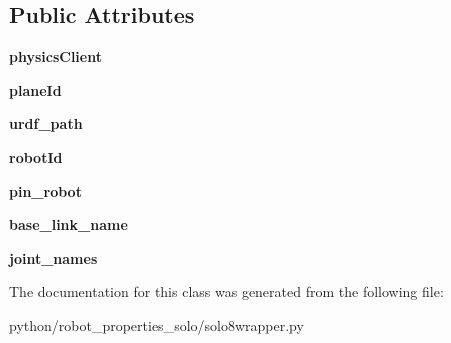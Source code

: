 \subsection*{Public Attributes}
\begin{DoxyCompactItemize}
\item 
\mbox{\label{classrobot__properties__solo_1_1solo8wrapper_1_1Solo8Robot_af82fb3fc2b4f8a60353bb8ff96713fd7}} 
{\bfseries physics\+Client}
\item 
\mbox{\label{classrobot__properties__solo_1_1solo8wrapper_1_1Solo8Robot_aae39d72dbc2fb10f4809cf1f55edb993}} 
{\bfseries plane\+Id}
\item 
\mbox{\label{classrobot__properties__solo_1_1solo8wrapper_1_1Solo8Robot_a43aff6849cbb3535a0cece77ef41b383}} 
{\bfseries urdf\+\_\+path}
\item 
\mbox{\label{classrobot__properties__solo_1_1solo8wrapper_1_1Solo8Robot_a38b69aeb9598f0261afdb96b531a26bc}} 
{\bfseries robot\+Id}
\item 
\mbox{\label{classrobot__properties__solo_1_1solo8wrapper_1_1Solo8Robot_a00db0b1bfe4e0bb7e09faa3ab174eb53}} 
{\bfseries pin\+\_\+robot}
\item 
\mbox{\label{classrobot__properties__solo_1_1solo8wrapper_1_1Solo8Robot_ae67c30be8142a5387d0b89e10c617b76}} 
{\bfseries base\+\_\+link\+\_\+name}
\item 
\mbox{\label{classrobot__properties__solo_1_1solo8wrapper_1_1Solo8Robot_a802f51847eecd38bbf0153087e0c59a1}} 
{\bfseries joint\+\_\+names}
\end{DoxyCompactItemize}


The documentation for this class was generated from the following file\+:\begin{DoxyCompactItemize}
\item 
python/robot\+\_\+properties\+\_\+solo/solo8wrapper.\+py\end{DoxyCompactItemize}
